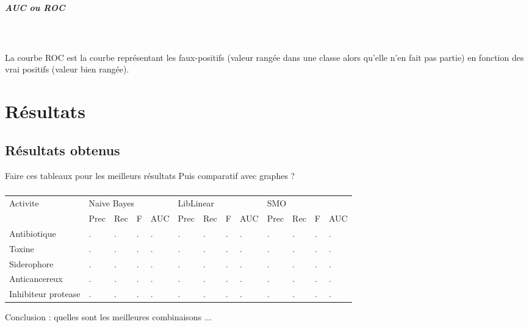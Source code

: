 \documentclass[a4paper,10pt]{report}
\begin{document}
	     \paragraph{AUC ou ROC}\\
		
	     ~\\La courbe ROC est la courbe représentant les faux-positifs (valeur rangée dans une classe alors qu'elle n'en fait pas partie) en fonction des vrai positifs (valeur bien rangée).
	     
	 
   \chapter{Résultats}

	  
      \section{Résultats obtenus}
	 
	  
	  Faire ces tableaux pour les meilleurs résultats
	  Puis comparatif avec graphes ? 
	  \paragraph{}
	   \begin{flushleft}
	    \leftskip -3cm
	    \begin{tabular}{|l|l|l|l|l|l|l|l|l|l||l|l|l|}\hline
	      \multirow{2}{|l|}{Activite} & \multicolumn{4}{|l|}{Naive Bayes} & \multicolumn{4}{|l|}{LibLinear} & \multicolumn{4}{|l|}{SMO} \\\cline{2-13}
	       & Prec & Rec & F & AUC & Prec & Rec & F & AUC & Prec & Rec & F & AUC & \\\hline
	      Antibiotique & . & . & . & . & . & . & . & . & . & . & . & . & \\\hline
	      Toxine & . & . & . & . & . & . & . & . & . & . & . & . & \\\hline
	      Siderophore & . & . & . & . & . & . & . & . & . & . & . & . & \\\hline
	      Anticancereux & . & . & . & . & . & . & . & . & . & . & . & . & \\\hline
	      Inhibiteur protease & . & . & . & . & . & . & . & . & . & . & . & . & \\\hline
	    \end{tabular}
	  \end{flushleft}
	  
	  
	  Conclusion : quelles sont les meilleures combinaisons ... 
      
\end{document}
